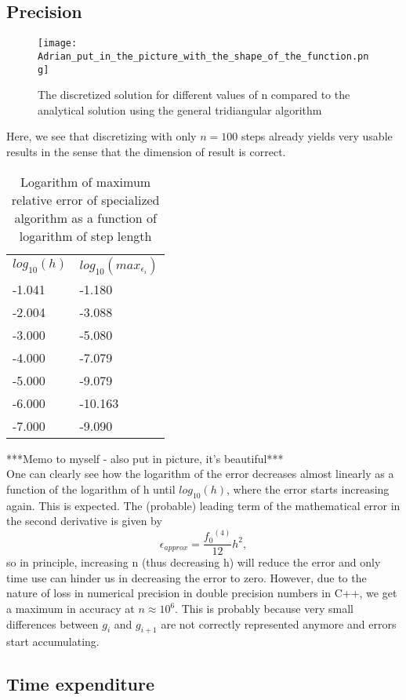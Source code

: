 \documentclass[10pt,a4paper]{article}
\begin{document}
\subsection{Precision}
\begin{center}
\begin{figure}[H]
	\texttt{[image: Adrian\_put\_in\_the\_picture\_with\_the\_shape\_of\_the\_function.png]}
	\caption[Form of solution]{The discretized solution for different values of n compared to the analytical solution using the general tridiangular algorithm}
\end{figure}
\end{center}
Here, we see that discretizing with only $n=100$ steps already yields very usable results in the sense that the dimension of result is correct.
\begin{table}[H]
\caption[Relative error of specialized algorithm]{Logarithm of maximum relative error of specialized algorithm as a function of logarithm of step length}
\begin{tabular}{ll}
$log_{10}(h)$ &  $log_{10}(max_{\epsilon_i})$ \\
 -1.041 & -1.180 \\
 -2.004 & -3.088 \\
 -3.000 & -5.080 \\
 -4.000 & -7.079 \\
 -5.000 & -9.079 \\
 -6.000 & -10.163 \\
 -7.000 & -9.090 

\end{tabular}
\end{table}
***Memo to myself - also put in picture, it's beautiful***\\
One can clearly see how the logarithm of the error decreases almost linearly as a function of the logarithm of h until $log_{10}(h)$, where the error starts increasing again. This is expected. The (probable) leading term of the mathematical error in the second derivative is given by $$\epsilon_{approx}=\frac{{f_0}^{(4)}}{12}h^2,$$ so in principle, increasing n (thus decreasing h) will reduce the error and only time use can hinder us in decreasing the error to zero. However, due to the nature of loss in numerical precision in double precision numbers in C++, we get a maximum in accuracy at $n \approx 10^6$.  This is probably because very small differences between $g_i$ and $g_{i+1}$
 are not correctly represented anymore and errors start accumulating.
\subsection{Time expenditure}
\end{document}
